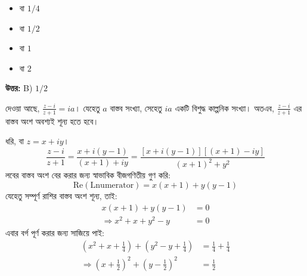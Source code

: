 \documentclass[12pt, a4paper]{article}
\begin{document}
\begin{itemize}[label={}, leftmargin=1cm, itemsep=0.5em]
    \item[\textbf{A)}] বা $1/4$
    \item[\textbf{B)}] বা $1/2$
    \item[\textbf{C)}] বা $1$
    \item[\textbf{D)}] বা $2$
\end{itemize}

\vspace{0.5em}
\begin{tcolorbox}[answerbox]
    \textbf{\color{success} উত্তর:} B) $1/2$
\end{tcolorbox}
\vspace{1em}

\begin{tcolorbox}[solutionbox={সমাধান (Solution)}]
    \noindent
    দেওয়া আছে, $\frac{z-i}{z+1} = ia$। যেহেতু $a$ বাস্তব সংখ্যা, সেহেতু $ia$ একটি বিশুদ্ধ কাল্পনিক সংখ্যা। অতএব, $\frac{z-i}{z+1}$ এর বাস্তব অংশ অবশ্যই শূন্য হতে হবে। 
    
    ধরি, বা $z = x+iy$। 
    \[ \frac{z-i}{z+1} = \frac{x+i(y-1)}{(x+1)+iy} = \frac{[x+i(y-1)][(x+1)-iy]}{(x+1)^2+y^2} \]
    লবের বাস্তব অংশ বের করার জন্য স্বাভাবিক বীজগণিতীয় গুণ করি:
    \[ \text{Re}(\text{Lnumerator}) = x(x+1) + y(y-1) \]
    যেহেতু সম্পূর্ণ রাশির বাস্তব অংশ শূন্য, তাই:
    \begin{align*}
        x(x+1) + y(y-1) &= 0 \\
        \Rightarrow x^2 + x + y^2 - y &= 0
    \end{align*}
    এবার বর্গ পূর্ণ করার জন্য সাজিয়ে পাই:
    \begin{align*}
        \left(x^2 + x + \frac{1}{4}\right) + \left(y^2 - y + \frac{1}{4}\right) &= \frac{1}{4} + \frac{1}{4} \\
        \Rightarrow \left(x + \frac{1}{2}\right)^2 + \left(y - \frac{1}{2}\right)^2 &= \frac{1}{2}
    \end{align*}
\end{tcolorbox}

\vspace{1em}
\end{document}
